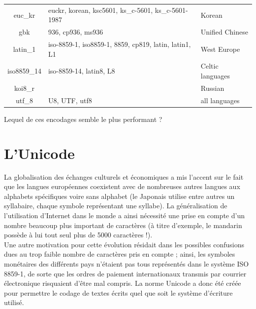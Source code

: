 \begin{center}
{\begin{tabular}{cll}
            euc\_kr         & euckr, korean, ksc5601, ks\_c-5601, ks\_c-5601-1987   & Korean                                                \\
            gbk             & 936, cp936, ms936                                     & Unified Chinese                                       \\
            latin\_1        & iso-8859-1, iso8859-1, 8859, cp819, latin, latin1, L1 & West Europe                                           \\
            iso8859\_14     & iso-8859-14, latin8, L8                               & Celtic languages                                      \\
            koi8\_r         &                                                       & Russian                                               \\
            utf\_8          & U8, UTF, utf8                                         & all languages                                         \\
        \end{tabular}}
\end{center}

\begin{exercice}[]
    Lequel de ces encodages semble le plus performant ?
\end{exercice}


\section{L'Unicode}

La globalisation des échanges culturels et économiques a mis l'accent sur le fait que les langues européennes coexistent avec de nombreuses
autres
langues aux alphabets spécifiques voire sans alphabet (le Japonais utilise entre autres un syllabaire, chaque symbole représentant une syllabe).
La
généralisation de l'utilisation d'Internet dans le monde a ainsi nécessité une prise en compte d'un
nombre beaucoup plus important de caractères (à titre d'exemple, le mandarin possède à lui tout seul plus de 5000 caractères !).\\
Une autre motivation pour cette
évolution résidait dans les possibles confusions dues au trop faible nombre de caractères pris en compte ; ainsi, les symboles monétaires des
différents
pays n'étaient pas tous représentés dans le système ISO 8859-1, de sorte que les ordres de paiement internationaux transmis par courrier
électronique
risquaient d'être mal compris. La norme Unicode a donc été créée pour permettre le codage de textes écrits quel que soit le système d'écriture
utilisé.\\


